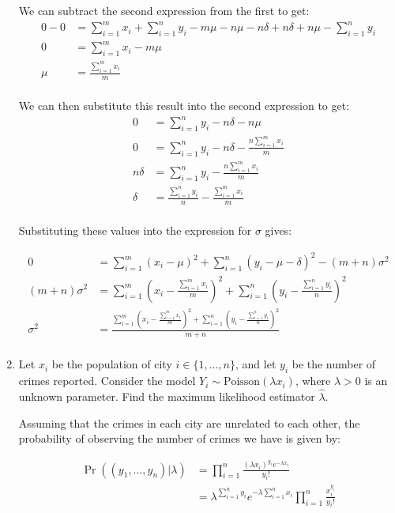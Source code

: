 \documentclass[10pt,\jkfside,a4paper]{article}
\begin{document}
\begin{enumerate}
We can subtract the second expression from the first to get:
\[
\begin{split}
0 - 0 &= \sum^{m}_{i=1} x_i + \sum^{n}_{i=1} y_i - m\mu - n\mu - n\delta
+ n\delta + n\mu - \sum^{n}_{i=1} y_i \\
0 &= \sum^{m}_{i=1} x_i - m\mu\\
\mu &= \frac{\sum^m_{i=1} x_i}{m} \\
\end{split}
\]

We can then substitute this result into the second expression to get:
\[
\begin{split}
0 &= \sum^n_{i=1} y_i - n\delta - n\mu\\
0 &= \sum^n_{i=1} y_i - n\delta - \frac{n\sum^m_{i=1} x_i}{m}\\
n\delta &= \sum^n_{i=1} y_i - \frac{n\sum^m_{i=1} x_i}{m} \\
\delta &= \frac{\sum^n_{i=1} y_i}{n} - \frac{\sum^m_{i=1} x_i}{m} \\
\end{split}
\]

Substituting these values into the expression for $\sigma$ gives:

\[
\begin{split}
0 &= \sum^m_{i=1}(x_i - \mu)^2 + \sum^n_{i=1} (y_i - \mu - \delta)^2 - (m +
n)\sigma^2 \\
(m + n)\sigma^2 &= \sum^m_{i=1}\left( x_i - \frac{\sum^m_{i=1}x_i}{m}
\right)^2 + \sum^n_{i=1}\left( y_i - \frac{\sum^n_{i=1}y_i}{n} \right)^2 \\
\sigma^2 &= \frac{\sum^m_{i=1}\left( x_i - \frac{\sum^m_{i=1}x_i}{m}
\right)^2 + \sum^n_{i=1}\left( y_i - \frac{\sum^n_{i=1}y_i}{n} \right)^2}{m
+ n} \\
\end{split}
\]

\item Let $x_i$ be the population of city $i \in \{1, \dots, n\}$, and let
$y_i$ be the number of crimes reported. Consider the model $Y_i \sim
\text{Poisson}(\lambda x_i)$, where $\lambda > 0$ is an unknown parameter.
Find the maximum likelihood estimator $\hat{\lambda}$.

Assuming that the crimes in each city are unrelated to each other, the
probability of observing the number of crimes we have is given by:

\[
\begin{split}
\Pr((y_1, \dots, y_n) | \lambda) &=
\prod^n_{i=1} \frac{\left( \lambda x_i \right)^{y_i} e^{-\lambda x_i}}{y_i
!} \\
&= \lambda^{\sum^n_{i=1}y_i}e^{-\lambda\sum^n_{i=1}x_i} \prod^n_{i=1}
\frac{x_i^{y_i}}{y_i!} \\
\end{split}
\]


\end{enumerate}
\end{document}
